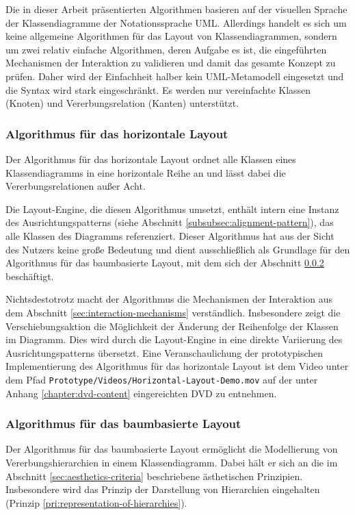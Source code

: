 Die in dieser Arbeit präsentierten Algorithmen basieren auf der visuellen Sprache der Klassendiagramme der Notationssprache UML. Allerdings handelt es sich um keine allgemeine Algorithmen für das Layout von Klassendiagrammen, sondern um zwei relativ einfache Algorithmen, deren Aufgabe es ist, die eingeführten Mechanismen der Interaktion zu validieren und damit das gesamte Konzept zu prüfen. Daher wird der Einfachheit halber kein UML-Metamodell eingesetzt und die Syntax wird stark eingeschränkt. Es werden nur vereinfachte Klassen (Knoten) und Vererbungsrelation (Kanten) unterstützt.

\subsubsection{Algorithmus für das horizontale Layout}
\label{subsubsec:horizontal-layout-algorithm}

Der Algorithmus für das horizontale Layout ordnet alle Klassen eines Klassendiagramms in eine horizontale Reihe an und lässt dabei die Vererbungsrelationen außer Acht.

Die Layout-Engine, die diesen Algorithmus umsetzt, enthält intern eine Instanz des Ausrichtungspatterns (siehe Abschnitt \ref{subsubsec:alignment-pattern}), das alle Klassen des Diagramms referenziert. Dieser Algorithmus hat aus der Sicht des Nutzers keine große Bedeutung und dient ausschließlich als Grundlage für den Algorithmus für das baumbasierte Layout, mit dem sich der Abschnitt \ref{subsubsec:tree-layout-algorithm} beschäftigt.

Nichtsdestotrotz macht der Algorithmus die Mechanismen der Interaktion aus dem Abschnitt \ref{sec:interaction-mechanisms} verständlich. Insbesondere zeigt die Verschiebungsaktion die Möglichkeit der Änderung der Reihenfolge der Klassen im Diagramm. Dies wird durch die Layout-Engine in eine direkte Variierung des Ausrichtungspatterns übersetzt. Eine Veranschaulichung der prototypischen Implementierung des Algorithmus für das horizontale Layout ist dem Video unter dem Pfad \texttt{Prototype/Videos/Hori\-zon\-tal-\-Lay\-out-\-De\-mo.mov} auf der unter Anhang \ref{chapter:dvd-content} eingereichten DVD zu entnehmen.

\subsubsection{Algorithmus für das baumbasierte Layout}
\label{subsubsec:tree-layout-algorithm}

Der Algorithmus für das baumbasierte Layout ermöglicht die Modellierung von Vererbungshierarchien in einem Klassendiagramm. Dabei hält er sich an die im Abschnitt \ref{sec:aesthetics-criteria} beschriebene ästhetischen Prinzipien. Insbesondere wird das Prinzip der Darstellung von Hierarchien eingehalten (Prinzip \ref{pri:representation-of-hierarchies}).

